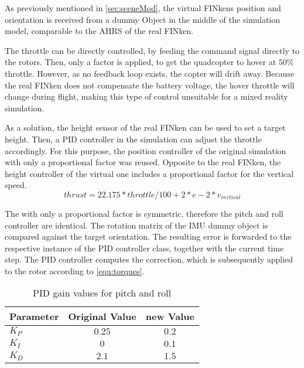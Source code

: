 As previously mentioned in \ref{sec:sceneMod}, the virtual FINkens position and orientation is received from a dummy Object in the middle of the simulation model, comparable to the \gls{AHRS} of the real FINken.

The throttle can be directly controlled, by feeding the command signal directly to the rotors. 
Then, only a factor is applied, to get the quadcopter to hover at $50 \%$ throttle. 
However, as no feedback loop exists, the copter will drift away.
Because the real FINken does not compensate the battery voltage, the hover throttle will change during flight, making this type of control unsuitable for a mixed reality simulation.

As a solution, the height sensor of the real FINken can be used to set a target height.
Then, a \gls{PID} controller in the simulation can adjust the throttle accordingly.
For this purpose, the position controller of the original simulation with only a proportional factor was reused. 
Opposite to the real FINken, the height controller of the virtual one includes a proportional factor for the vertical speed.
\begin{equation}
thrust = 22.175 * throttle/100 +2 * e  - 2 *v_{vertical}
\end{equation}


The with only a proportional factor is symmetric, therefore the pitch and roll controller are identical.
The rotation matrix of the \gls{IMU} dummy object is compared against the target orientation.
The resulting error is forwarded to the respective instance of the \gls{PID} controller class, together with the current time step.
The \gls{PID} controller computes the correction, which is subsequently applied to the rotor according to \ref{equ:torques}.

\begin{table}[h]
	\centering
	\begin{tabular}{|l|c|c|}
    		\hline
		Parameter & Original Value & new Value \\
		\hline
    		$K_P$ & $0.25$ &  $0.2$\\
    		\hline
		$K_I$ & $0$ & $0.1$   \\
    		\hline
		$K_D$  & $2.1$ & $1.5$  \\
    		\hline
	\end{tabular}
    	\caption{\gls{PID} gain values for pitch and roll}
      	\label{tab:PIDpitchroll}
\end{table}


